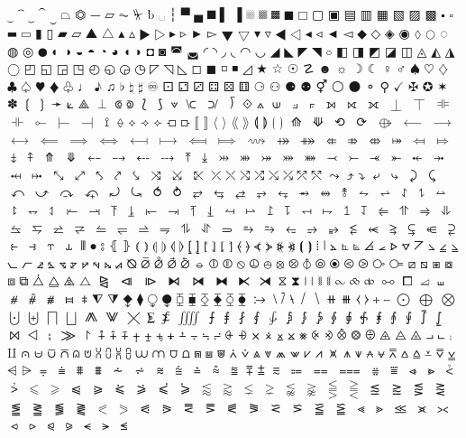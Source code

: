 $⏝$
$⏞$
$⏟$
$⏠$
$⏡$
$⏢$
$⏣$
$⏤$
$⏥$
$⏦$
$⏧$
$␢$
$␣$
$┆$
$▀$
$▄$
$█$
$▌$
$▐$
$░$
$▒$
$▓$
$■$
$□$
$▢$
$▣$
$▤$
$▥$
$▦$
$▧$
$▨$
$▩$
$▪$
$▫$
$▬$
$▭$
$▮$
$▯$
$▰$
$▱$
$▲$
$△$
$▴$
$▵$
$▶$
$▷$
$▸$
$▹$
$►$
$▻$
$▼$
$▽$
$▾$
$▿$
$◀$
$◁$
$◂$
$◃$
$◄$
$◅$
$◆$
$◇$
$◈$
$◉$
$◊$
$○$
$◌$
$◍$
$◎$
$●$
$◐$
$◑$
$◒$
$◓$
$◔$
$◕$
$◖$
$◗$
$◘$
$◙$
$◚$
$◛$
$◜$
$◝$
$◞$
$◟$
$◠$
$◡$
$◢$
$◣$
$◤$
$◥$
$◦$
$◧$
$◨$
$◩$
$◪$
$◫$
$◬$
$◭$
$◮$
$◯$
$◰$
$◱$
$◲$
$◳$
$◴$
$◵$
$◶$
$◷$
$◸$
$◹$
$◺$
$◻$
$◼$
$◽$
$◾$
$◿$
$★$
$☆$
$☉$
$☡$
$☻$
$☼$
$☽$
$☾$
$♀$
$♂$
$♠$
$♡$
$♢$
$♣$
$♤$
$♥$
$♦$
$♧$
$♩$
$♪$
$♫$
$♭$
$♮$
$♯$
$♾$
$⚀$
$⚁$
$⚂$
$⚃$
$⚄$
$⚅$
$⚆$
$⚇$
$⚈$
$⚉$
$⚥$
$⚪$
$⚫$
$⚬$
$⚲$
$✓$
$✠$
$✪$
$✶$
$✽$
$❲$
$❳$
$➛$
$⟀$
$⟁$
$⟂$
$⟃$
$⟄$
$⟅$
$⟆$
$⟇$
$⟈$
$⟉$
$⟌$
$⟐$
$⟑$
$⟒$
$⟓$
$⟔$
$⟕$
$⟖$
$⟗$
$⟘$
$⟙$
$⟚$
$⟛$
$⟜$
$⟝$
$⟞$
$⟟$
$⟠$
$⟡$
$⟢$
$⟣$
$⟤$
$⟥$
$⟦$
$⟧$
$⟨$
$⟩$
$⟪$
$⟫$
$⟬$
$⟭$
$⟮$
$⟯$
$⟰$
$⟱$
$⟲$
$⟳$
$⟴$
$⟵$
$⟶$
$⟷$
$⟸$
$⟹$
$⟺$
$⟻$
$⟼$
$⟽$
$⟾$
$⟿$
$⤀$
$⤁$
$⤂$
$⤃$
$⤄$
$⤅$
$⤆$
$⤇$
$⤈$
$⤉$
$⤊$
$⤋$
$⤌$
$⤍$
$⤎$
$⤏$
$⤒$
$⤓$
$⤔$
$⤕$
$⤖$
$⤗$
$⤘$
$⤙$
$⤚$
$⤛$
$⤜$
$⤝$
$⤞$
$⤟$
$⤠$
$⤡$
$⤢$
$⤣$
$⤤$
$⤥$
$⤨$
$⤩$
$⤪$
$⤫$
$⤬$
$⤭$
$⤮$
$⤯$
$⤰$
$⤱$
$⤲$
$⤳$
$⤴$
$⤵$
$⤶$
$⤷$
$⤸$
$⤹$
$⤺$
$⤻$
$⤼$
$⤽$
$⤾$
$⤿$
$⥀$
$⥁$
$⥂$
$⥃$
$⥄$
$⥅$
$⥆$
$⥇$
$⥈$
$⥉$
$⥊$
$⥋$
$⥌$
$⥍$
$⥎$
$⥏$
$⥐$
$⥑$
$⥒$
$⥓$
$⥔$
$⥕$
$⥖$
$⥗$
$⥘$
$⥙$
$⥚$
$⥛$
$⥜$
$⥝$
$⥞$
$⥟$
$⥠$
$⥡$
$⥢$
$⥣$
$⥤$
$⥥$
$⥦$
$⥧$
$⥨$
$⥩$
$⥪$
$⥫$
$⥬$
$⥭$
$⥮$
$⥯$
$⥰$
$⥱$
$⥲$
$⥳$
$⥴$
$⥵$
$⥶$
$⥷$
$⥸$
$⥹$
$⥺$
$⥻$
$⥼$
$⥽$
$⥾$
$⥿$
$⦀$
$⦁$
$⦂$
$⦃$
$⦄$
$⦅$
$⦆$
$⦇$
$⦈$
$⦉$
$⦊$
$⦋$
$⦌$
$⦍$
$⦎$
$⦏$
$⦐$
$⦑$
$⦒$
$⦓$
$⦔$
$⦕$
$⦖$
$⦗$
$⦘$
$⦙$
$⦚$
$⦛$
$⦜$
$⦝$
$⦞$
$⦟$
$⦠$
$⦡$
$⦢$
$⦣$
$⦤$
$⦥$
$⦦$
$⦧$
$⦨$
$⦩$
$⦪$
$⦫$
$⦬$
$⦭$
$⦮$
$⦯$
$⦰$
$⦱$
$⦲$
$⦳$
$⦴$
$⦵$
$⦶$
$⦷$
$⦸$
$⦹$
$⦺$
$⦻$
$⦼$
$⦽$
$⦾$
$⦿$
$⧀$
$⧁$
$⧂$
$⧃$
$⧄$
$⧅$
$⧆$
$⧇$
$⧈$
$⧉$
$⧊$
$⧋$
$⧌$
$⧍$
$⧎$
$⧏$
$⧐$
$⧑$
$⧒$
$⧓$
$⧔$
$⧕$
$⧖$
$⧗$
$⧘$
$⧙$
$⧚$
$⧛$
$⧜$
$⧝$
$⧞$
$⧟$
$⧠$
$⧡$
$⧢$
$⧣$
$⧤$
$⧥$
$⧦$
$⧧$
$⧨$
$⧩$
$⧪$
$⧫$
$⧬$
$⧭$
$⧮$
$⧯$
$⧰$
$⧱$
$⧲$
$⧳$
$⧴$
$⧵$
$⧶$
$⧷$
$⧸$
$⧹$
$⧺$
$⧻$
$⧼$
$⧽$
$⧾$
$⧿$
$⨀$
$⨁$
$⨂$
$⨃$
$⨄$
$⨅$
$⨆$
$⨇$
$⨈$
$⨉$
$⨊$
$⨋$
$⨌$
$⨍$
$⨎$
$⨏$
$⨐$
$⨑$
$⨒$
$⨓$
$⨔$
$⨕$
$⨖$
$⨗$
$⨘$
$⨙$
$⨚$
$⨛$
$⨜$
$⨝$
$⨞$
$⨟$
$⨠$
$⨡$
$⨢$
$⨣$
$⨤$
$⨥$
$⨦$
$⨧$
$⨨$
$⨩$
$⨪$
$⨫$
$⨬$
$⨭$
$⨮$
$⨯$
$⨰$
$⨱$
$⨲$
$⨳$
$⨴$
$⨵$
$⨶$
$⨷$
$⨸$
$⨹$
$⨺$
$⨻$
$⨼$
$⨽$
$⨾$
$⨿$
$⩀$
$⩁$
$⩂$
$⩃$
$⩄$
$⩅$
$⩆$
$⩇$
$⩈$
$⩉$
$⩊$
$⩋$
$⩌$
$⩍$
$⩎$
$⩏$
$⩐$
$⩑$
$⩒$
$⩓$
$⩔$
$⩕$
$⩖$
$⩗$
$⩘$
$⩙$
$⩚$
$⩛$
$⩜$
$⩝$
$⩞$
$⩟$
$⩠$
$⩡$
$⩢$
$⩣$
$⩤$
$⩥$
$⩦$
$⩧$
$⩨$
$⩩$
$⩪$
$⩫$
$⩬$
$⩭$
$⩮$
$⩯$
$⩰$
$⩱$
$⩲$
$⩳$
$⩴$
$⩵$
$⩶$
$⩷$
$⩸$
$⩹$
$⩺$
$⩻$
$⩼$
$⩽$
$⩾$
$⩿$
$⪀$
$⪁$
$⪂$
$⪃$
$⪄$
$⪅$
$⪆$
$⪇$
$⪈$
$⪉$
$⪊$
$⪋$
$⪌$
$⪍$
$⪎$
$⪏$
$⪐$
$⪑$
$⪒$
$⪓$
$⪔$
$⪕$
$⪖$
$⪗$
$⪘$
$⪙$
$⪚$
$⪛$
$⪜$
$⪝$
$⪞$
$⪟$
$⪠$
$⪡$
$⪢$
$⪣$
$⪤$
$⪥$
$⪦$
$⪧$
$⪨$
$⪩$
$⪪$
$⪫$
$⪬$
